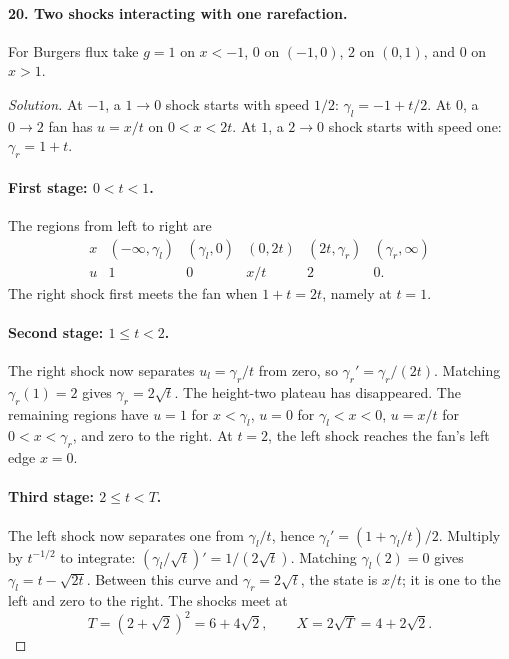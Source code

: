 \paragraph{20. Two shocks interacting with one rarefaction.}
For Burgers flux take $g=1$ on $x<-1$, $0$ on $(-1,0)$,
$2$ on $(0,1)$, and $0$ on $x>1$.
\begin{proof}[Solution]
At $-1$, a $1\to0$ shock starts with speed $1/2$:
$\gamma_l=-1+t/2$.
At $0$, a $0\to2$ fan has $u=x/t$ on $0<x<2t$.
At $1$, a $2\to0$ shock starts with speed one:
$\gamma_r=1+t$.

\paragraph{First stage: $0<t<1$.}
The regions from left to right are
\[
 \begin{array}{c|ccccc}
 x&(-\infty,\gamma_l)&(\gamma_l,0)&(0,2t)&(2t,\gamma_r)&(\gamma_r,\infty)\\
 u&1&0&x/t&2&0 .
 \end{array}
\]
The right shock first meets the fan when $1+t=2t$, namely at $t=1$.

\paragraph{Second stage: $1\leq t<2$.}
The right shock now separates $u_l=\gamma_r/t$ from zero, so
$\gamma_r'=\gamma_r/(2t)$.
Matching $\gamma_r(1)=2$ gives $\gamma_r=2\sqrt t$.
The height-two plateau has disappeared.
The remaining regions have $u=1$ for $x<\gamma_l$,
$u=0$ for $\gamma_l<x<0$, $u=x/t$ for $0<x<\gamma_r$,
and zero to the right.
At $t=2$, the left shock reaches the fan's left edge $x=0$.

\paragraph{Third stage: $2\leq t<T$.}
The left shock now separates one from $\gamma_l/t$, hence
$\gamma_l'=(1+\gamma_l/t)/2$.
Multiply by $t^{-1/2}$ to integrate:
$(\gamma_l/\sqrt t)'=1/(2\sqrt t)$.
Matching $\gamma_l(2)=0$ gives
$\gamma_l=t-\sqrt{2t}$.
Between this curve and $\gamma_r=2\sqrt t$, the state is $x/t$;
it is one to the left and zero to the right.
The shocks meet at
\[
 T=(2+\sqrt2)^2=6+4\sqrt2,\qquad X=2\sqrt T=4+2\sqrt2.
\]


\end{proof}
